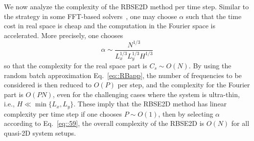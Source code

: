 We now analyze the complexity of the RBSE2D method per time step. 
Similar to the strategy in some FFT-based solvers~\cite{deserno1998mesh,lindbo2012fast}, one may choose $\alpha$ such that the time cost in real space is cheap and the computation in the Fourier space is accelerated. 
More precisely, one chooses
\begin{equation}\label{eq::59}
	\alpha\sim\frac{N^{1/3}}{L_x^{1/3}L_y^{1/3} H^{1/3}}
\end{equation}
so that the complexity for the real space part is $C_{s}\sim O(N)$. 
By using the random batch approximation Eq.~\eqref{eq::RBapp}, the number of frequencies to be considered is then reduced to $O(P)$ per step, and  the complexity for the Fourier part is $O(PN)$, even for the challenging cases where the system is ultra-thin, i.e., $H \ll \min\{L_x,L_y\}$.
These imply that the RBSE2D method has linear complexity per time step if one chooses $P\sim O(1)$, then by selecting $\alpha$ according to Eq.~\eqref{eq::59}, 
the overall complexity of the RBSE2D is $O(N)$ for all quasi-2D system setups.

